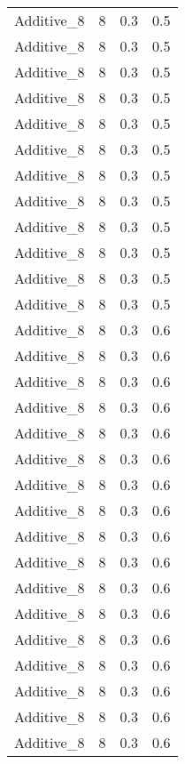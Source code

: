 \documentclass{article}
\begin{document}
\begin{longtable}[H]{lrrr}
 Additive\_8 &       8 &   0.3 &            0.5 \\
 Additive\_8 &       8 &   0.3 &            0.5 \\
 Additive\_8 &       8 &   0.3 &            0.5 \\
 Additive\_8 &       8 &   0.3 &            0.5 \\
 Additive\_8 &       8 &   0.3 &            0.5 \\
 Additive\_8 &       8 &   0.3 &            0.5 \\
 Additive\_8 &       8 &   0.3 &            0.5 \\
 Additive\_8 &       8 &   0.3 &            0.5 \\
 Additive\_8 &       8 &   0.3 &            0.5 \\
 Additive\_8 &       8 &   0.3 &            0.5 \\
 Additive\_8 &       8 &   0.3 &            0.5 \\
 Additive\_8 &       8 &   0.3 &            0.5 \\
 Additive\_8 &       8 &   0.3 &            0.6 \\
 Additive\_8 &       8 &   0.3 &            0.6 \\
 Additive\_8 &       8 &   0.3 &            0.6 \\
 Additive\_8 &       8 &   0.3 &            0.6 \\
 Additive\_8 &       8 &   0.3 &            0.6 \\
 Additive\_8 &       8 &   0.3 &            0.6 \\
 Additive\_8 &       8 &   0.3 &            0.6 \\
 Additive\_8 &       8 &   0.3 &            0.6 \\
 Additive\_8 &       8 &   0.3 &            0.6 \\
 Additive\_8 &       8 &   0.3 &            0.6 \\
 Additive\_8 &       8 &   0.3 &            0.6 \\
 Additive\_8 &       8 &   0.3 &            0.6 \\
 Additive\_8 &       8 &   0.3 &            0.6 \\
 Additive\_8 &       8 &   0.3 &            0.6 \\
 Additive\_8 &       8 &   0.3 &            0.6 \\
 Additive\_8 &       8 &   0.3 &            0.6 \\
 Additive\_8 &       8 &   0.3 &            0.6 \\

\end{longtable}
\end{document}
